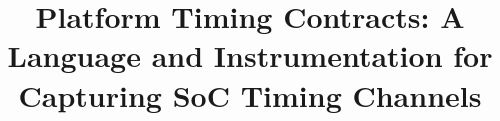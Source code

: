 \documentclass[conference]{IEEEtran}
\begin{document}
\newcommand{\para}[1]{\vspace{0.6\baselineskip}\noindent\textbf{#1.}}

\newcommand{\Pic}{Platform timing contract\xspace}
\newcommand{\pic}{platform timing contract\xspace}
\newcommand{\Pics}{Platform timing contracts\xspace}
\newcommand{\pics}{platform timing contracts\xspace}
\newcommand{\pici}{platform timing contract instrumentation\xspace}
\newcommand{\Pici}{Platform timing contract instrumentation\xspace}
\newcommand{\PICI}{PTCI\xspace}
\newcommand{\PICIs}{PTCIs\xspace}
\newcommand{\ucfi}{$\mu$CFI\xspace}

\title{Platform Timing Contracts: A Language and Instrumentation for Capturing SoC Timing Channels}

\end{document}
